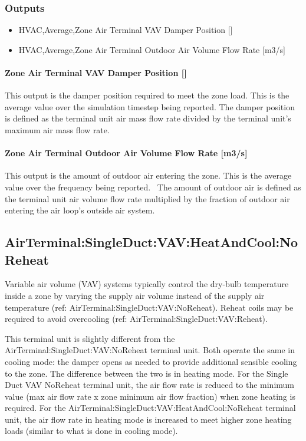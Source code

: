 \subsubsection{Outputs}\label{outputs-5}

\begin{itemize}
\item
  HVAC,Average,Zone Air Terminal VAV Damper Position {[]}
\item
  HVAC,Average,Zone Air Terminal Outdoor Air Volume Flow Rate {[}m3/s{]}
\end{itemize}

\paragraph{Zone Air Terminal VAV Damper Position {[]}}\label{zone-air-terminal-vav-damper-position-3}

This output is the damper position required to meet the zone load. This is the average value over the simulation timestep being reported. The damper position is defined as the terminal unit air mass flow rate divided by the terminal unit's maximum air mass flow rate.

\paragraph{Zone Air Terminal Outdoor Air Volume Flow Rate {[}m3/s{]}}\label{zone-air-terminal-outdoor-air-volume-flow-rate-m3s-1}

This output is the amount of outdoor air entering the zone. This is the average value over the frequency being reported.~ The amount of outdoor air is defined as the terminal unit air volume flow rate multiplied by the fraction of outdoor air entering the air loop's outside air system.

\subsection{AirTerminal:SingleDuct:VAV:HeatAndCool:NoReheat}\label{airterminalsingleductvavheatandcoolnoreheat}

Variable air volume (VAV) systems typically control the dry-bulb temperature inside a zone by varying the supply air volume instead of the supply air temperature (ref: AirTerminal:SingleDuct:VAV:NoReheat). Reheat coils may be required to avoid overcooling (ref: AirTerminal:SingleDuct:VAV:Reheat).

This terminal unit is slightly different from the AirTerminal:SingleDuct:VAV:NoReheat terminal unit. Both operate the same in cooling mode: the damper opens as needed to provide additional sensible cooling to the zone. The difference between the two is in heating mode. For the Single Duct VAV NoReheat terminal unit, the air flow rate is reduced to the minimum value (max air flow rate x zone minimum air flow fraction) when zone heating is required. For the AirTerminal:SingleDuct:VAV:HeatAndCool:NoReheat terminal unit, the air flow rate in heating mode is increased to meet higher zone heating loads (similar to what is done in cooling mode).

